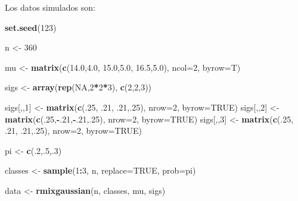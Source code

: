 \documentclass[11pt,]{article}
\newenvironment{Shaded}{\begin{snugshade}}{\end{snugshade}}
\newcommand{\KeywordTok}[1]{\textcolor[rgb]{0.13,0.29,0.53}{\textbf{#1}}}
\newcommand{\DataTypeTok}[1]{\textcolor[rgb]{0.13,0.29,0.53}{#1}}
\newcommand{\DecValTok}[1]{\textcolor[rgb]{0.00,0.00,0.81}{#1}}
\newcommand{\FloatTok}[1]{\textcolor[rgb]{0.00,0.00,0.81}{#1}}
\newcommand{\StringTok}[1]{\textcolor[rgb]{0.31,0.60,0.02}{#1}}
\newcommand{\OtherTok}[1]{\textcolor[rgb]{0.56,0.35,0.01}{#1}}
\newcommand{\OperatorTok}[1]{\textcolor[rgb]{0.81,0.36,0.00}{\textbf{#1}}}
\newcommand{\NormalTok}[1]{#1}
\begin{document}
Los datos simulados son:

\begin{Shaded}
\begin{Highlighting}[]
\KeywordTok{set.seed}\NormalTok{(}\DecValTok{123}\NormalTok{)}

\NormalTok{n <-}\StringTok{ }\DecValTok{360}

\NormalTok{mu <-}\StringTok{ }\KeywordTok{matrix}\NormalTok{(}\KeywordTok{c}\NormalTok{(}\FloatTok{14.0}\NormalTok{,}\FloatTok{4.0}\NormalTok{,}
               \FloatTok{15.0}\NormalTok{,}\FloatTok{5.0}\NormalTok{,}
               \FloatTok{16.5}\NormalTok{,}\FloatTok{5.0}\NormalTok{), }\DataTypeTok{ncol=}\DecValTok{2}\NormalTok{, }\DataTypeTok{byrow=}\NormalTok{T)}

\NormalTok{sigs <-}\StringTok{ }\KeywordTok{array}\NormalTok{(}\KeywordTok{rep}\NormalTok{(}\OtherTok{NA}\NormalTok{,}\DecValTok{2}\OperatorTok{*}\DecValTok{2}\OperatorTok{*}\DecValTok{3}\NormalTok{), }\KeywordTok{c}\NormalTok{(}\DecValTok{2}\NormalTok{,}\DecValTok{2}\NormalTok{,}\DecValTok{3}\NormalTok{))}

\NormalTok{sigs[,,}\DecValTok{1}\NormalTok{] <-}\StringTok{ }\KeywordTok{matrix}\NormalTok{(}\KeywordTok{c}\NormalTok{(.}\DecValTok{25}\NormalTok{, .}\DecValTok{21}\NormalTok{, .}\DecValTok{21}\NormalTok{,.}\DecValTok{25}\NormalTok{), }\DataTypeTok{nrow=}\DecValTok{2}\NormalTok{, }\DataTypeTok{byrow=}\OtherTok{TRUE}\NormalTok{)}
\NormalTok{sigs[,,}\DecValTok{2}\NormalTok{] <-}\StringTok{ }\KeywordTok{matrix}\NormalTok{(}\KeywordTok{c}\NormalTok{(.}\DecValTok{25}\NormalTok{,}\OperatorTok{-}\NormalTok{.}\DecValTok{21}\NormalTok{,}\OperatorTok{-}\NormalTok{.}\DecValTok{21}\NormalTok{,.}\DecValTok{25}\NormalTok{), }\DataTypeTok{nrow=}\DecValTok{2}\NormalTok{, }\DataTypeTok{byrow=}\OtherTok{TRUE}\NormalTok{)}
\NormalTok{sigs[,,}\DecValTok{3}\NormalTok{] <-}\StringTok{ }\KeywordTok{matrix}\NormalTok{(}\KeywordTok{c}\NormalTok{(.}\DecValTok{25}\NormalTok{, .}\DecValTok{21}\NormalTok{, .}\DecValTok{21}\NormalTok{,.}\DecValTok{25}\NormalTok{), }\DataTypeTok{nrow=}\DecValTok{2}\NormalTok{, }\DataTypeTok{byrow=}\OtherTok{TRUE}\NormalTok{)}

\NormalTok{pi <-}\StringTok{ }\KeywordTok{c}\NormalTok{(.}\DecValTok{2}\NormalTok{,.}\DecValTok{5}\NormalTok{,.}\DecValTok{3}\NormalTok{)}

\NormalTok{classes <-}\StringTok{ }\KeywordTok{sample}\NormalTok{(}\DecValTok{1}\OperatorTok{:}\DecValTok{3}\NormalTok{, n, }\DataTypeTok{replace=}\OtherTok{TRUE}\NormalTok{, }\DataTypeTok{prob=}\NormalTok{pi)}

\NormalTok{data <-}\StringTok{ }\KeywordTok{rmixgaussian}\NormalTok{(n, classes, mu, sigs)}
\end{Highlighting}
\end{Shaded}
\end{document}
